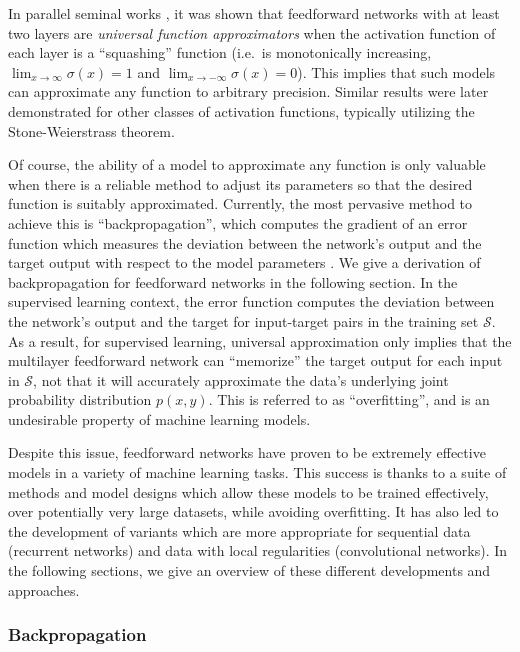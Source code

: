 In parallel seminal works \cite{cybenko1989approximation, hornik1989multilayer}, it was shown that feedforward networks with at least two layers are {\em universal function approximators} when the activation function of each layer is a ``squashing'' function (i.e.\ is monotonically increasing, $\lim_{x \rightarrow \infty} \sigma(x) = 1$ and $\lim_{x \rightarrow -\infty} \sigma(x) = 0$).
This implies that such models can approximate any function to arbitrary precision.
Similar results were later demonstrated for other classes of activation functions, typically utilizing the Stone-Weierstrass theorem.

Of course, the ability of a model to approximate any function is only valuable when there is a reliable method to adjust its parameters so that the desired function is suitably approximated.
Currently, the most pervasive method to achieve this is ``backpropagation'', which computes the gradient of an error function which measures the deviation between the network's output and the target output with respect to the model parameters \cite{rumelhart1986learning}.
We give a derivation of backpropagation for feedforward networks in the following section.
In the supervised learning context, the error function computes the deviation between the network's output and the target for input-target pairs in the training set $\mathcal{S}$.
As a result, for supervised learning, universal approximation only implies that the multilayer feedforward network can ``memorize'' the target output for each input in $\mathcal{S}$, not that it will accurately approximate the data's underlying joint probability distribution $p(x, y)$.
This is referred to as ``overfitting'', and is an undesirable property of machine learning models.

Despite this issue, feedforward networks have proven to be extremely effective models in a variety of machine learning tasks.
This success is thanks to a suite of methods and model designs which allow these models to be trained effectively, over potentially very large datasets, while avoiding overfitting.
It has also led to the development of variants which are more appropriate for sequential data (recurrent networks) and data with local regularities (convolutional networks).
In the following sections, we give an overview of these different developments and approaches.

\subsubsection{Backpropagation}

